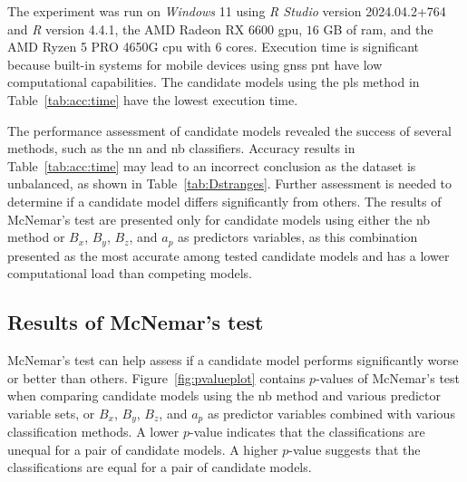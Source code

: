 \let\LaTeXcline\cline\documentclass[sn-mathphys-num]{sn-jnl}\let\cline\LaTeXcline
\begin{document}
The experiment was run on \textit{Windows} 11 using \textit{R Studio} version 2024.04.2+764 and \textit{R} version 4.4.1, the AMD Radeon RX 6600 \acrfull{gpu}, $16$ GB of \acrfull{ram}, and the AMD Ryzen 5 PRO 4650G \acrfull{cpu} with $6$ cores. Execution time is significant because built-in systems for mobile devices using \acrshort{gnss} \acrshort{pnt} have low computational capabilities. The candidate models using the \acrfull{pls} method in Table~\ref{tab:acc:time} have the lowest execution time.

The performance assessment of candidate models revealed the success of several methods, such as the \acrfull{nn} and \acrfull{nb} classifiers. Accuracy results in Table~\ref{tab:acc:time} may lead to an incorrect conclusion as the dataset is unbalanced, as shown in Table~\ref{tab:Dstranges}. Further assessment is needed to determine if a candidate model differs significantly from others. The results of
McNemar’s test are presented only for candidate models using either the \acrfull{nb} method or $B_{x}$, $B_{y}$, $B_{z}$, and $a_{p}$ as predictors variables, as this combination presented as the most accurate among tested candidate models and has a lower computational load than competing models.

\subsection{Results of McNemar's test}

McNemar’s test can help assess if a candidate model performs significantly worse or better than others. Figure~\ref{fig:pvalueplot} contains $p$-values of McNemar's test when comparing candidate models using the \acrfull{nb} method and various predictor variable sets, or $B_{x}$, $B_{y}$, $B_{z}$, and $a_{p}$ as predictor variables combined with various classification methods. A lower $p$-value indicates that the classifications are unequal for a pair of candidate models. A higher $p$-value suggests that the classifications are equal for a pair of candidate models.
\end{document}

